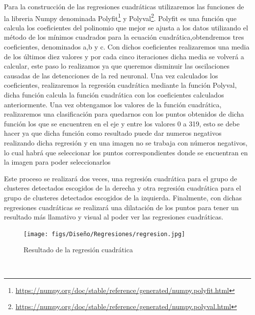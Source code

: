 Para la construcción de las regresiones cuadráticas utilizaremos las funciones de la libreria Numpy denominada Polyfit\footnote{\url{https://numpy.org/doc/stable/reference/generated/numpy.polyfit.html}}
y Polyval\footnote{\url{ https://numpy.org/doc/stable/reference/generated/numpy.polyval.html}}. 
Polyfit es una función que calcula los  coeficientes del polinomio que mejor se ajusta a los datos utilizando el método de los mínimos 
cuadrados para la ecuación cuadrática,obtendremos tres coeficientes, denominados a,b y c. \newline
\newline
Con dichos coeficientes realizaremos una media de los últimos diez valores y por cada cinco iteraciones dicha media se volverá a calcular, este paso lo realizamos ya que 
queremos disminuir las oscilaciones causadas de las detencciones de la red neuronal. Una vez calculados los coeficientes, realizaremos la regresión cuadrática mediante la función Polyval, dicha función calcula
la función cuadrática con los coeficientes calculados anteriormente. \newline 
Una vez obtengamos los valores de la función cuadrática, realizaremos una clasificación para quedarnos con los puntos obtenidos
de dicha función los que se encuentren en el eje y entre los valores 0 a 319, esto se debe hacer ya que dicha función como resultado puede dar numeros negativos realizando dicha regresión y en una 
imagen no se trabaja con números negativos, lo cual habrá que seleccionar los puntos correspondientes donde se encuentran en la imagen para poder seleccionarlos \newline

Este proceso se realizará dos veces, una regresión cuadrática para el grupo de clusteres detectados escogidos de la derecha y otra regresión cuadrática para el grupo de clusteres detectados
escogidos de la izquierda. \newline
Finalmente, con dichas regresiones cuadráticas se realizará una dilatación de los puntos para tener un resultado más llamativo y visual al poder
ver las regresiones cuadráticas.\newline

\begin{figure} [H]
  \begin{center}
    \texttt{[image: figs/Diseño/Regresiones/regresion.jpg]}
  \end{center}
  \caption{Resultado de la regresión cuadrática}
  \label{fig:regresión cuadrática}
\end{figure}\

